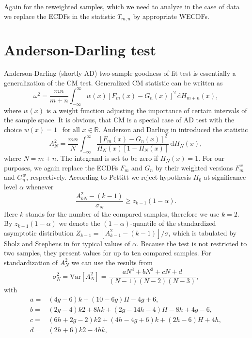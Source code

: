 Again for the reweighted samples, which we need to analyze in the case of \dzero data we replace the ECDFs in the statistic $T_{m,n}$ by appropriate WECDFs.

\section{Anderson-Darling test}
Anderson-Darling (shortly AD)  two-sample goodness of fit test is essentially a generalization of the CM test. Generalized CM statistic can be written as 
\begin{equation}
\omega^2 = \frac{mn}{m+n} \int_{-\infty}^\infty w(x) \left[F_m(x) - G_n(x) \right]^2 \,\mathrm{d} H_{m+n}(x),
\end{equation}
where $w(x)$ is a weight function adjusting the importance of certain intervals of the sample space. It is obvious, that CM is a special case of AD test with the choice $w(x) = 1 \:\: \text{ for all } x \in \mathbb{R}.$ Anderson and Darling   in \cite{AndersonDarling1954} introduced the statistic 
\begin{equation}
A^2_{N} = \frac{mn}{N} \int_{-\infty}^\infty \frac{\left[F_m(x) - G_n(x) \right]^2}{H_{N}(x)\left[ 1 - H_{N}(x)\right]} \,\mathrm{d} H_{N}(x),
\label{eq:ADstat}
\end{equation}
where $N = m+n$. The integrand is set to be zero if $H_{N}(x) = 1$. For our purposes, we again replace the ECDFs $F_m$ and $G_n$ by their weighted versions $F_m^w$ and $G_n^w$, respectively.
According to Pettitt \cite{Pettitt1976} we reject hypothesis $H_0$ at significance level $\alpha$ whenever
\begin{equation}
\frac{A^2_{kN} - (k-1)}{\sigma_{N}} \geq z_{k-1}(1-\alpha).
\end{equation}
Here $k$ stands for the number of the compared samples, therefore we use $k=2$. By $z_{k-1}(1-\alpha)$ we denote the $(1-\alpha)$-quantile of the standardized asymptotic distribution $Z_{k-1} = [A^2_{k-1} - (k-1)]/{\sigma}$, which is tabulated by Sholz and Stephens in \cite{Sholz1986} for typical values of $\alpha$.  Because the test is not restricted to two samples, they present values for up to ten compared samples.
For standardization of $A^2_{N}$ we can use the results from \cite{Sholz1986} 
\begin{equation}
\sigma_{N}^2 = \mathrm{Var}\left[ A^2_{N}\right] = \frac{ aN^3 + bN^2 + cN + d
 }{(N-1)(N-2)(N-3)},
\end{equation}
with 
\begin{align*}
a = & (4g - 6)k + (10 - 6g)H - 4g + 6, \\
b = &(2g - 4)k 2 + 8hk + (2g - 14h - 4)H - 8h + 4g - 6, \\
c = &(6h + 2g - 2)k2 + (4h - 4g + 6)k + (2h - 6)H + 4h,  \\
d = &(2h + 6)k 2 - 4hk, 
\end{align*}
